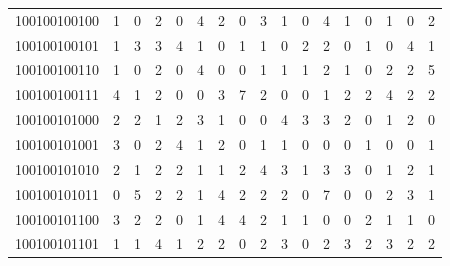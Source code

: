 \documentclass[10pt,a4paper]{article}
\begin{document}
\begin{longtable}{ |c|c|c|c|c|c|c|c|c|c|c|c|c|c|c|c|c| }
    100100100100              & 1                            & 0                                & 2                            & 0                              & 4   & 2   & 0   & 3   & 1   & 0   & 4   & 1   & 0   & 1   & 0   & 2   \\
    100100100101              & 1                            & 3                                & 3                            & 4                              & 1   & 0   & 1   & 1   & 0   & 2   & 2   & 0   & 1   & 0   & 4   & 1   \\
    100100100110              & 1                            & 0                                & 2                            & 0                              & 4   & 0   & 0   & 1   & 1   & 1   & 2   & 1   & 0   & 2   & 2   & 5   \\
    100100100111              & 4                            & 1                                & 2                            & 0                              & 0   & 3   & 7   & 2   & 0   & 0   & 1   & 2   & 2   & 4   & 2   & 2   \\
    100100101000              & 2                            & 2                                & 1                            & 2                              & 3   & 1   & 0   & 0   & 4   & 3   & 3   & 2   & 0   & 1   & 2   & 0   \\
    100100101001              & 3                            & 0                                & 2                            & 4                              & 1   & 2   & 0   & 1   & 1   & 0   & 0   & 0   & 1   & 0   & 0   & 1   \\
    100100101010              & 2                            & 1                                & 2                            & 2                              & 1   & 1   & 2   & 4   & 3   & 1   & 3   & 3   & 0   & 1   & 2   & 1   \\
    100100101011              & 0                            & 5                                & 2                            & 2                              & 1   & 4   & 2   & 2   & 2   & 0   & 7   & 0   & 0   & 2   & 3   & 1   \\
    100100101100              & 3                            & 2                                & 2                            & 0                              & 1   & 4   & 4   & 2   & 1   & 1   & 0   & 0   & 2   & 1   & 1   & 0   \\
    100100101101              & 1                            & 1                                & 4                            & 1                              & 2   & 2   & 0   & 2   & 3   & 0   & 2   & 3   & 2   & 3   & 2   & 2   \\

\end{longtable}
\end{document}
